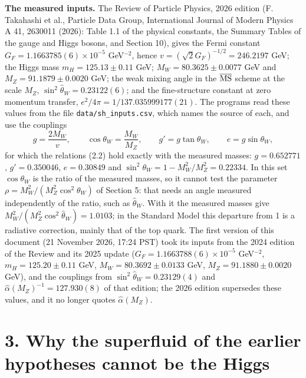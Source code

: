 \documentclass[
  10pt,
]{article}
\begin{document}
\textbf{The measured inputs.} The Review of Particle Physics, 2026
edition (F. Takahashi et al., Particle Data Group, International Journal
of Modern Physics A 41, 2630011 (2026): Table 1.1 of the physical
constants, the Summary Tables of the gauge and Higgs bosons, and Section
10), gives the Fermi constant \(G_F=1.1663785(6)\times10^{-5}\)
GeV\(^{-2}\), hence \(v=(\sqrt2G_F)^{-1/2}=246.2197\) GeV; the Higgs
mass \(m_H=125.13\pm0.11\) GeV; \(M_W=80.3625\pm0.0077\) GeV and
\(M_Z=91.1879\pm0.0020\) GeV; the weak mixing angle in the
\(\overline{\rm MS}\) scheme at the scale \(M_Z\),
\(\sin^2\hat\theta_W=0.23122(6)\); and the fine-structure constant at
zero momentum transfer, \(e^2/4\pi=1/137.035999177(21)\). The programs
read these values from the file \texttt{data/sh\_inputs.csv}, which
names the source of each, and use the couplings
\[g=\frac{2M_W}{v},\qquad\cos\theta_W=\frac{M_W}{M_Z},\qquad g'=g\tan\theta_W,\qquad e=g\sin\theta_W,\tag{2.3}\]
for which the relations (2.2) hold exactly with the measured masses:
\(g=0.652771\), \(g'=0.350046\), \(e=0.30849\) and
\(\sin^2\theta_W=1-M_W^2/M_Z^2=0.22334\). In this set \(\cos\theta_W\)
is the ratio of the measured masses, so it cannot test the parameter
\(\rho=M_W^2/(M_Z^2\cos^2\theta_W)\) of Section 5: that needs an angle
measured independently of the ratio, such as \(\hat\theta_W\). With it
the measured masses give \(M_W^2/(M_Z^2\cos^2\hat\theta_W)=1.0103\); in
the Standard Model this departure from 1 is a radiative correction,
mainly that of the top quark. The first version of this document (21
November 2026, 17:24 PST) took its inputs from the 2024 edition of the
Review and its 2025 update (\(G_F=1.1663788(6)\times10^{-5}\)
GeV\(^{-2}\), \(m_H=125.20\pm0.11\) GeV, \(M_W=80.3692\pm0.0133\) GeV,
\(M_Z=91.1880\pm0.0020\) GeV), and the couplings from
\(\sin^2\hat\theta_W=0.23129(4)\) and
\(\hat\alpha(M_Z)^{-1}=127.930(8)\) of that edition; the 2026 edition
supersedes these values, and it no longer quotes \(\hat\alpha(M_Z)\).

\hypertarget{why-the-superfluid-of-the-earlier-hypotheses-cannot-be-the-higgs}{%
\section{3. Why the superfluid of the earlier hypotheses cannot be the
Higgs}\label{why-the-superfluid-of-the-earlier-hypotheses-cannot-be-the-higgs}}
\end{document}
